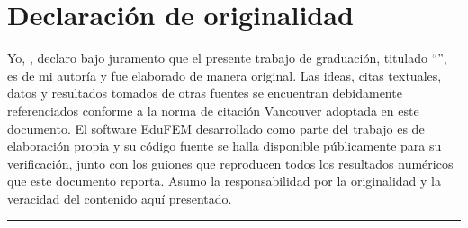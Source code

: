 
\chapter*{Declaración de originalidad}

\noindent Yo, \autorTesis, declaro bajo juramento que el presente trabajo de graduación, titulado \enquote{\tituloTesis}, es de mi autoría y fue elaborado de manera original. Las ideas, citas textuales, datos y resultados tomados de otras fuentes se encuentran debidamente referenciados conforme a la norma de citación Vancouver adoptada en este documento. El software EduFEM desarrollado como parte del trabajo es de elaboración propia y su código fuente se halla disponible públicamente para su verificación, junto con los guiones que reproducen todos los resultados numéricos que este documento reporta. Asumo la responsabilidad por la originalidad y la veracidad del contenido aquí presentado.

%

\vspace{2.5cm}
\begin{center}
\rule{7cm}{0.4pt}\\[2pt]
\autorTesis\\
\carrera\\
\ciudadTesis
\end{center}

